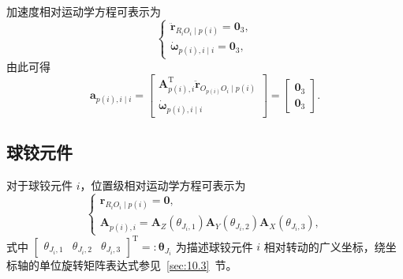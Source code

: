 加速度相对运动学方程可表示为
\begin{equation}\label{eq:10.29}
  \begin{cases}
    \ddot{\boldsymbol{r}}_{R_i O_i \mid p(i)} = \boldsymbol{0}_3, \\
    \dot{\boldsymbol{\omega}}_{p(i),i \mid i} = \boldsymbol{0}_3,
  \end{cases}
\end{equation}
由此可得
\begin{equation}\label{eq:10.30}
  \boldsymbol{a}_{p(i),i \mid i} = \begin{bmatrix} \boldsymbol{A}_{p(i),i}^{\mathrm{T}} \ddot{\boldsymbol{r}}_{O_{p(i)} O_i \mid p(i)} \\ \dot{\boldsymbol{\omega}}_{p(i),i \mid i} \end{bmatrix}
  = \begin{bmatrix} \boldsymbol{0}_3 \\ \boldsymbol{0}_3 \end{bmatrix}.
\end{equation}

\subsection{球铰元件}

对于球铰元件 $i$，位置级相对运动学方程可表示为
\begin{equation}\label{eq:10.31}
  \begin{cases}
    \boldsymbol{r}_{R_i O_i \mid p(i)} = \boldsymbol{0}, \\
    \boldsymbol{A}_{p(i),i} = \boldsymbol{A}_Z(\theta_{J_i,1}) \boldsymbol{A}_Y(\theta_{J_i,2}) \boldsymbol{A}_X(\theta_{J_i,3}),
  \end{cases}
\end{equation}
式中 $\begin{bmatrix} \theta_{J_i,1} & \theta_{J_i,2} & \theta_{J_i,3} \end{bmatrix}^{\mathrm{T}} =: \boldsymbol{\theta}_{J_i}$ 为描述球铰元件 $i$ 相对转动的广义坐标，绕坐标轴的单位旋转矩阵表达式参见~\ref{sec:10.3}~节。

